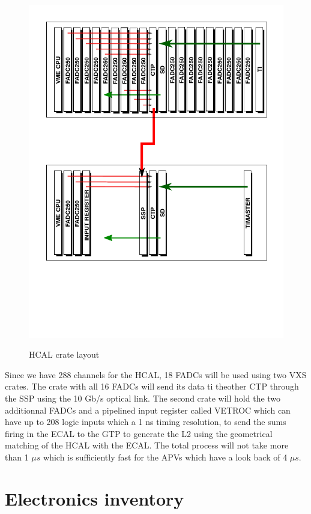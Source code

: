 \documentclass{article}
\begin{document}
\begin{figure}
	\centering
	\includegraphics[width=\textwidth]{figs/VXSHCalFADC.pdf}\\
	\caption{HCAL crate layout }\label{fig:HCALFADC}
\end{figure}

Since we have 288 channels for the HCAL, 18 FADCs will be used using two VXS crates. The crate with all 16 FADCs will send its data ti theother CTP through the SSP using the 10 Gb/s optical link. The second crate will hold the two additionnal FADCs and a pipelined input register called VETROC which can have up to 208 logic inputs which a 1 ns timing resolution, to send the sums firing in the ECAL to the GTP to generate the L2 using the geometrical matching of the HCAL with the ECAL. The total process will not take more than 1 $\mu s$ which is sufficiently fast for the APVs which have a look back of 4 $\mu s$.

\section{Electronics inventory}
\label{sec:inventory}
\end{document}
